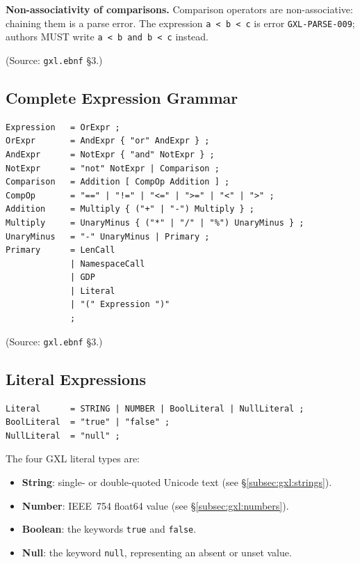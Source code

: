 \noindent\textbf{Non-associativity of comparisons.}
Comparison operators are non-associative: chaining them is a parse error.
The expression \texttt{a < b < c} is error \texttt{GXL-PARSE-009};
authors MUST write \texttt{a < b and b < c} instead.

(Source: \texttt{gxl.ebnf} \S3.)

\subsection{Complete Expression Grammar}
\label{subsec:gxl:grammar}

\begin{verbatim}
Expression   = OrExpr ;
OrExpr       = AndExpr { "or" AndExpr } ;
AndExpr      = NotExpr { "and" NotExpr } ;
NotExpr      = "not" NotExpr | Comparison ;
Comparison   = Addition [ CompOp Addition ] ;
CompOp       = "==" | "!=" | "<=" | ">=" | "<" | ">" ;
Addition     = Multiply { ("+" | "-") Multiply } ;
Multiply     = UnaryMinus { ("*" | "/" | "%") UnaryMinus } ;
UnaryMinus   = "-" UnaryMinus | Primary ;
Primary      = LenCall
             | NamespaceCall
             | GDP
             | Literal
             | "(" Expression ")"
             ;
\end{verbatim}

(Source: \texttt{gxl.ebnf} \S3.)

\subsection{Literal Expressions}
\label{subsec:gxl:literals}

\begin{verbatim}
Literal      = STRING | NUMBER | BoolLiteral | NullLiteral ;
BoolLiteral  = "true" | "false" ;
NullLiteral  = "null" ;
\end{verbatim}

The four GXL literal types are:

\begin{itemize}
  \item \textbf{String}: single- or double-quoted Unicode text
    (see \S\ref{subsec:gxl:strings}).
  \item \textbf{Number}: IEEE~754 float64 value
    (see \S\ref{subsec:gxl:numbers}).
  \item \textbf{Boolean}: the keywords \texttt{true} and \texttt{false}.
  \item \textbf{Null}: the keyword \texttt{null},
    representing an absent or unset value.
\end{itemize}

